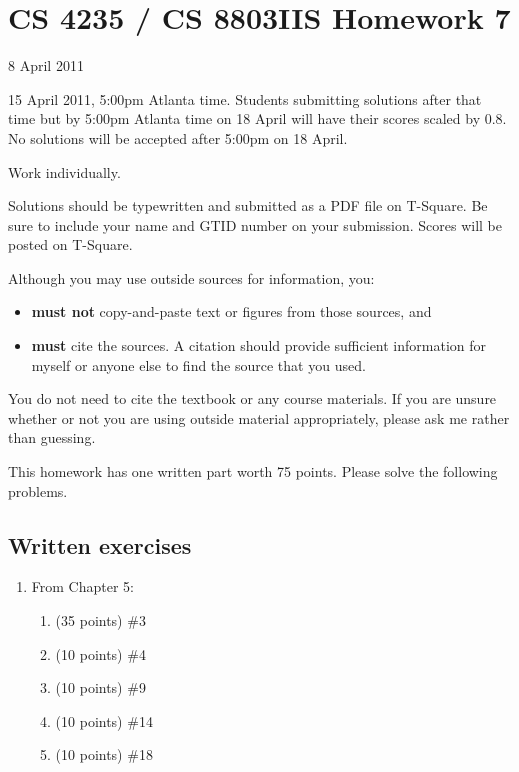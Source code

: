 \documentclass[letterpaper]{article}
\title{}
\date{}
\begin{document}
\thispagestyle{empty}

\section*{CS 4235 / CS 8803IIS Homework 7}

 8 April 2011

 15 April 2011, 5:00pm Atlanta time. Students submitting solutions after that time but by 5:00pm Atlanta time on 18 April will have their scores scaled by 0.8. No solutions will be accepted after 5:00pm on 18 April.

 Work individually.

\bigskip\noindent
Solutions should be typewritten and submitted as a PDF file on T-Square. Be sure to include your name and GTID number on your submission. Scores will be posted on T-Square.

\bigskip\noindent
Although you may use outside sources for information, you:
\begin{itemize}
\item {\bf must not} copy-and-paste text or figures from those sources, and
\item {\bf must} cite the sources. A citation should provide sufficient information for myself or anyone else to find the source that you used.
\end{itemize}
You do not need to cite the textbook or any course materials. If you are unsure whether or not you are using outside material appropriately, please ask me rather than guessing.

This homework has one written part worth 75 points. Please solve the following problems.

\subsection*{Written exercises}

\begin{enumerate}

\item From Chapter 5:
\begin{enumerate}
\item (35 points) \#3
\item (10 points) \#4
\item (10 points) \#9
\item (10 points) \#14
\item (10 points) \#18
\end{enumerate}

\end{enumerate}
\end{document}
